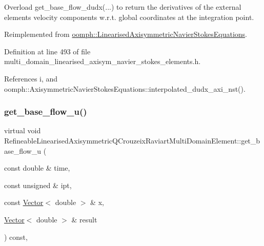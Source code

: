 Overload get\+\_\+base\+\_\+flow\+\_\+dudx(...) to return the derivatives of the external element\textquotesingle{}s velocity components w.\+r.\+t. global coordinates at the integration point. 



Reimplemented from \hyperlink{classoomph_1_1LinearisedAxisymmetricNavierStokesEquations_aa3924125dde70779c180b84408271422}{oomph\+::\+Linearised\+Axisymmetric\+Navier\+Stokes\+Equations}.



Definition at line 493 of file multi\+\_\+domain\+\_\+linearised\+\_\+axisym\+\_\+navier\+\_\+stokes\+\_\+elements.\+h.



References i, and oomph\+::\+Axisymmetric\+Navier\+Stokes\+Equations\+::interpolated\+\_\+dudx\+\_\+axi\+\_\+nst().

\mbox{\label{classRefineableLinearisedAxisymmetricQCrouzeixRaviartMultiDomainElement_a7c3e497fd77af087d4e9300810faf38e}} 
\subsubsection{\texorpdfstring{get\+\_\+base\+\_\+flow\+\_\+u()}{get\_base\_flow\_u()}}
{\footnotesize\ttfamily virtual void Refineable\+Linearised\+Axisymmetric\+Q\+Crouzeix\+Raviart\+Multi\+Domain\+Element\+::get\+\_\+base\+\_\+flow\+\_\+u (\begin{DoxyParamCaption}\item[{const double \&}]{time,  }\item[{const unsigned \&}]{ipt,  }\item[{const \hyperlink{classoomph_1_1Vector}{Vector}$<$ double $>$ \&}]{x,  }\item[{\hyperlink{classoomph_1_1Vector}{Vector}$<$ double $>$ \&}]{result }\end{DoxyParamCaption}) const\hspace{0.3cm}{\ttfamily [inline]}, {\ttfamily [virtual]}}



